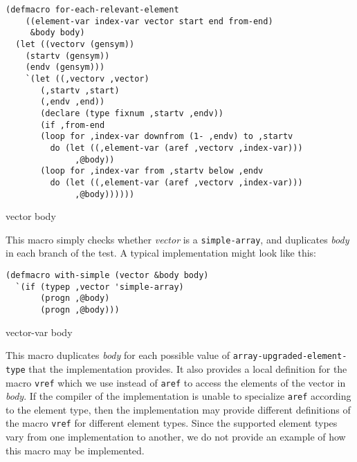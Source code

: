 {\small\begin{verbatim}
(defmacro for-each-relevant-element
    ((element-var index-var vector start end from-end)
     &body body)
  (let ((vectorv (gensym))
	(startv (gensym))
	(endv (gensym)))
    `(let ((,vectorv ,vector)
	   (,startv ,start)
	   (,endv ,end))
       (declare (type fixnum ,startv ,endv))
       (if ,from-end
	   (loop for ,index-var downfrom (1- ,endv) to ,startv
		 do (let ((,element-var (aref ,vectorv ,index-var)))
		      ,@body))
	   (loop for ,index-var from ,startv below ,endv
		 do (let ((,element-var (aref ,vectorv ,index-var)))
		      ,@body))))))
\end{verbatim}}

 {vector \body body}

This macro simply checks whether \textit{vector} is a
\texttt{simple-array}, and duplicates \textit{body} in each branch of
the test.  A typical implementation might look like this:

{\small\begin{verbatim}
(defmacro with-simple (vector &body body)
  `(if (typep ,vector 'simple-array)
       (progn ,@body)
       (progn ,@body)))
\end{verbatim}}

 {vector-var \body body}

This macro duplicates \textit{body} for each possible value of
\texttt{array-upgraded-element-type} that the implementation provides.
It also provides a local definition for the macro \texttt{vref} which
we use instead of \texttt{aref} to access the elements of the vector
in \textit{body}.  If the compiler of the implementation is unable to
specialize \texttt{aref} according to the element type, then the
implementation may provide different definitions of the macro
\texttt{vref} for different element types.  Since the supported
element types vary from one implementation to another, we do not
provide an example of how this macro may be implemented.
